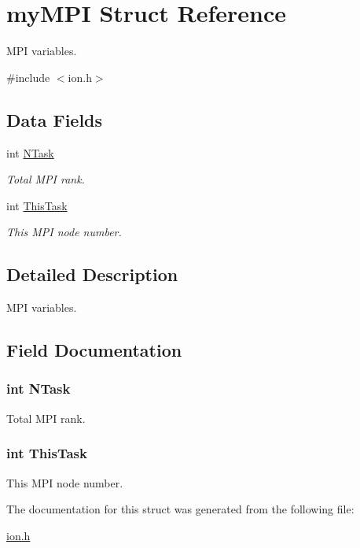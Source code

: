 \hypertarget{structmy_m_p_i}{\section{my\+M\+P\+I Struct Reference}
\label{structmy_m_p_i}
}


M\+P\+I variables.  




{\ttfamily \#include $<$ion.\+h$>$}

\subsection*{Data Fields}
\begin{DoxyCompactItemize}
\item 
int \hyperlink{structmy_m_p_i_a675acdcd149f5993271a1fdc11673b65}{N\+Task}
\begin{DoxyCompactList}\small\item\em Total M\+P\+I rank. \end{DoxyCompactList}\item 
int \hyperlink{structmy_m_p_i_a52c8c7d2abff436111942e02c5bb466a}{This\+Task}
\begin{DoxyCompactList}\small\item\em This M\+P\+I node number. \end{DoxyCompactList}\end{DoxyCompactItemize}


\subsection{Detailed Description}
M\+P\+I variables. 

\subsection{Field Documentation}
\hypertarget{structmy_m_p_i_a675acdcd149f5993271a1fdc11673b65}{
\subsubsection[{N\+Task}]{\setlength{\rightskip}{0pt plus 5cm}int N\+Task}}\label{structmy_m_p_i_a675acdcd149f5993271a1fdc11673b65}


Total M\+P\+I rank. 

\hypertarget{structmy_m_p_i_a52c8c7d2abff436111942e02c5bb466a}{
\subsubsection[{This\+Task}]{\setlength{\rightskip}{0pt plus 5cm}int This\+Task}}\label{structmy_m_p_i_a52c8c7d2abff436111942e02c5bb466a}


This M\+P\+I node number. 



The documentation for this struct was generated from the following file\+:\begin{DoxyCompactItemize}
\item 
\hyperlink{ion_8h}{ion.\+h}\end{DoxyCompactItemize}
